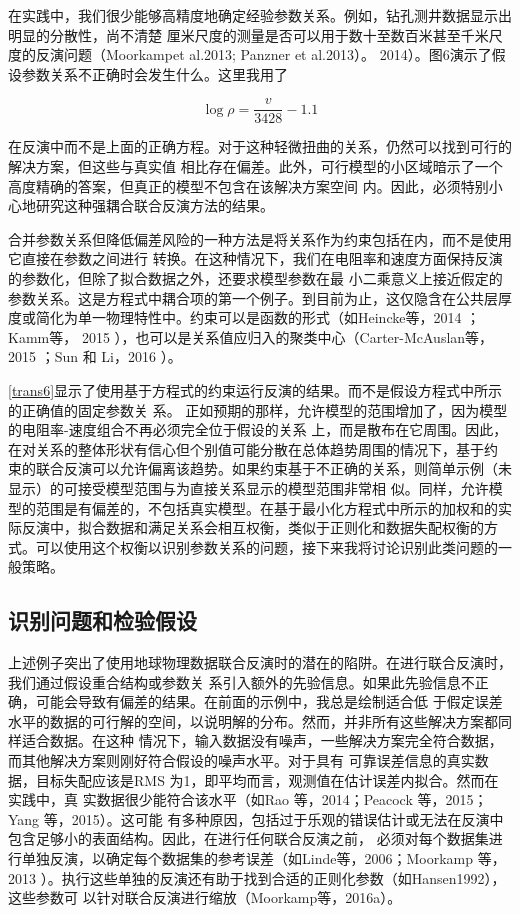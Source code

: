 在实践中，我们很少能够高精度地确定经验参数关系。例如，钻孔测井数据显示出明显的分散性，尚不清楚 厘米尺度的测量是否可以用于数十至数百米甚至千米尺度的反演问题（Moorkampet al.2013; Panzner et al.2013）。 2014）。图6演示了假设参数关系不正确时会发生什么。这里我用了

\begin{equation}
    \log \rho=\frac{v}{3428}-1.1
\end{equation}

在反演中而不是上面的正确方程。对于这种轻微扭曲的关系，仍然可以找到可行的解决方案，但这些与真实值 相比存在偏差。此外，可行模型的小区域暗示了一个高度精确的答案，但真正的模型不包含在该解决方案空间 内。因此，必须特别小心地研究这种强耦合联合反演方法的结果。

合并参数关系但降低偏差风险的一种方法是将关系作为约束包括在内，而不是使用它直接在参数之间进行 转换。在这种情况下，我们在电阻率和速度方面保持反演的参数化，但除了拟合数据之外，还要求模型参数在最 小二乘意义上接近假定的参数关系。这是方程式中耦合项的第一个例子。到目前为止，这仅隐含在公共层厚 度或简化为单一物理特性中。约束可以是函数的形式（如Heincke等，2014 ；Kamm等， 2015 ），也可以是关系值应归入的聚类中心（Carter-McAuslan等，2015 ；Sun 和 Li，2016 ）。

\ref{trans6}显示了使用基于方程式的约束运行反演的结果。而不是假设方程式中所示的正确值的固定参数关 系。 正如预期的那样，允许模型的范围增加了，因为模型的电阻率-速度组合不再必须完全位于假设的关系 上，而是散布在它周围。因此，在对关系的整体形状有信心但个别值可能分散在总体趋势周围的情况下，基于约 束的联合反演可以允许偏离该趋势。如果约束基于不正确的关系，则简单示例（未显示）的可接受模型范围与为直接关系显示的模型范围非常相 似。同样，允许模型的范围是有偏差的，不包括真实模型。在基于最小化方程式中所示的加权和的实际反演中，拟合数据和满足关系会相互权衡，类似于正则化和数据失配权衡的方式。可以使用这个权衡以识别参数关系的问题，接下来我将讨论识别此类问题的一般策略。

\subsection{识别问题和检验假设}

上述例子突出了使用地球物理数据联合反演时的潜在的陷阱。在进行联合反演时，我们通过假设重合结构或参数关 系引入额外的先验信息。如果此先验信息不正确，可能会导致有偏差的结果。在前面的示例中，我总是绘制适合低 于假定误差水平的数据的可行解的空间，以说明解的分布。然而，并非所有这些解决方案都同样适合数据。在这种 情况下，输入数据没有噪声，一些解决方案完全符合数据，而其他解决方案则刚好符合假设的噪声水平。对于具有 可靠误差信息的真实数据，目标失配应该是RMS 为1，即平均而言，观测值在估计误差内拟合。然而在实践中，真 实数据很少能符合该水平（如Rao 等，2014；Peacock 等，2015；Yang 等，2015）。这可能 有多种原因，包括过于乐观的错误估计或无法在反演中包含足够小的表面结构。因此，在进行任何联合反演之前， 必须对每个数据集进行单独反演，以确定每个数据集的参考误差（如Linde等，2006；Moorkamp 等，2013 ）。执行这些单独的反演还有助于找到合适的正则化参数（如Hansen1992），这些参数可 以针对联合反演进行缩放（Moorkamp等，2016a）。

